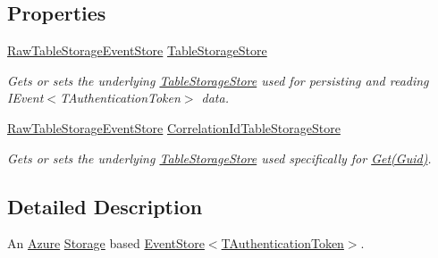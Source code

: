 \subsection*{Properties}
\begin{DoxyCompactItemize}
\item 
\hyperlink{classCqrs_1_1Azure_1_1BlobStorage_1_1Events_1_1TableStorageEventStore_1_1RawTableStorageEventStore}{Raw\+Table\+Storage\+Event\+Store} \hyperlink{classCqrs_1_1Azure_1_1BlobStorage_1_1Events_1_1TableStorageEventStore_ad86c24c28321c16b1f3601b3e7d870c4_ad86c24c28321c16b1f3601b3e7d870c4}{Table\+Storage\+Store}
\begin{DoxyCompactList}\small\item\em Gets or sets the underlying \hyperlink{classCqrs_1_1Azure_1_1BlobStorage_1_1TableStorageStore}{Table\+Storage\+Store} used for persisting and reading I\+Event$<$\+T\+Authentication\+Token$>$ data. \end{DoxyCompactList}\item 
\hyperlink{classCqrs_1_1Azure_1_1BlobStorage_1_1Events_1_1TableStorageEventStore_1_1RawTableStorageEventStore}{Raw\+Table\+Storage\+Event\+Store} \hyperlink{classCqrs_1_1Azure_1_1BlobStorage_1_1Events_1_1TableStorageEventStore_a06b6a3a1ac68dfce2d27aacadffa5beb_a06b6a3a1ac68dfce2d27aacadffa5beb}{Correlation\+Id\+Table\+Storage\+Store}
\begin{DoxyCompactList}\small\item\em Gets or sets the underlying \hyperlink{classCqrs_1_1Azure_1_1BlobStorage_1_1TableStorageStore}{Table\+Storage\+Store} used specifically for \hyperlink{classCqrs_1_1Azure_1_1BlobStorage_1_1Events_1_1TableStorageEventStore_a9b952a9257dc6f458b98eba87684412e_a9b952a9257dc6f458b98eba87684412e}{Get(\+Guid)}. \end{DoxyCompactList}\end{DoxyCompactItemize}


\subsection{Detailed Description}
An \hyperlink{namespaceCqrs_1_1Azure}{Azure} \hyperlink{namespaceCqrs_1_1Azure_1_1Storage}{Storage} based \hyperlink{classCqrs_1_1Events_1_1EventStore_a6346cb2aea4c5b4e740dc6cfb15abab8_a6346cb2aea4c5b4e740dc6cfb15abab8}{Event\+Store$<$\+T\+Authentication\+Token$>$}. 



